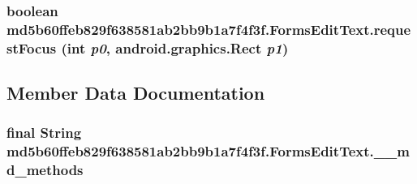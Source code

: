 \hypertarget{classmd5b60ffeb829f638581ab2bb9b1a7f4f3f_1_1_forms_edit_text_2cf9da01b54b44653275914d490d9716}{
\subsubsection[{requestFocus}]{\setlength{\rightskip}{0pt plus 5cm}boolean md5b60ffeb829f638581ab2bb9b1a7f4f3f.FormsEditText.requestFocus (int {\em p0}, \/  android.graphics.Rect {\em p1})}}
\label{classmd5b60ffeb829f638581ab2bb9b1a7f4f3f_1_1_forms_edit_text_2cf9da01b54b44653275914d490d9716}




\subsection{Member Data Documentation}
\hypertarget{classmd5b60ffeb829f638581ab2bb9b1a7f4f3f_1_1_forms_edit_text_2cbb395bc194ab641c62a79e13d6705f}{
\subsubsection[{\_\-\_\-md\_\-methods}]{\setlength{\rightskip}{0pt plus 5cm}final String {\bf md5b60ffeb829f638581ab2bb9b1a7f4f3f.FormsEditText.\_\-\_\-md\_\-methods}}}
\label{classmd5b60ffeb829f638581ab2bb9b1a7f4f3f_1_1_forms_edit_text_2cbb395bc194ab641c62a79e13d6705f}




